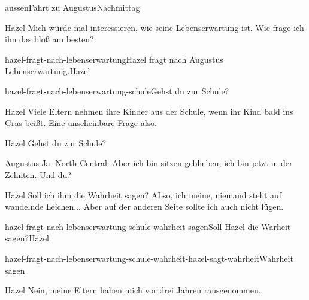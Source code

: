 \documentclass[12pt]{article}
\begin{document}
\begin{scene}{aussen}{Fahrt zu Augustus}{Nachmittag}
        \begin{dialog}[In Gedanken]{Hazel}
            Mich würde mal interessieren, wie seine Lebenserwartung ist.
            Wie frage ich ihn das bloß am besten?
        \end{dialog}

        \begin{decision}{hazel-fragt-nach-lebenserwartung}{\gls{Hazel} fragt nach \gls{Augustus} Lebenserwartung.}{Hazel}
            \begin{option}{hazel-fragt-nach-lebenserwartung-schule}{Gehst du zur Schule?}
                \begin{dialog}[In Gedanken]{Hazel}
                    Viele Eltern nehmen ihre Kinder aus der Schule, wenn ihr Kind bald ins Gras beißt.
                    Eine unscheinbare Frage also.
                \end{dialog}

                \begin{dialog}{Hazel}
                    Gehst du zur Schule?
                \end{dialog}

                \begin{dialog}{Augustus}
                    Ja. North Central.
                    Aber ich bin sitzen geblieben, ich bin jetzt in der Zehnten.
                    Und du?
                \end{dialog}

                \begin{dialog}[In Gedanken]{Hazel}
                    Soll ich ihm die Wahrheit sagen?
                    ALso, ich meine, niemand steht auf wandelnde Leichen...
                    Aber auf der anderen Seite sollte ich auch nicht lügen.
                \end{dialog}

                \begin{decision}{hazel-fragt-nach-lebenserwartung-schule-wahrheit-sagen}{Soll \gls{Hazel} die Warheit sagen?}{Hazel}
                    \begin{option}{hazel-fragt-nach-lebenserwartung-schule-wahrheit-hazel-sagt-wahrheit}{Wahrheit sagen}
                        \begin{dialog}{Hazel}
                            Nein, meine Eltern haben mich vor drei Jahren rausgenommen.
                        \end{dialog}


\end{option}
\end{decision}
\end{option}
\end{decision}
\end{scene}
\end{document}
